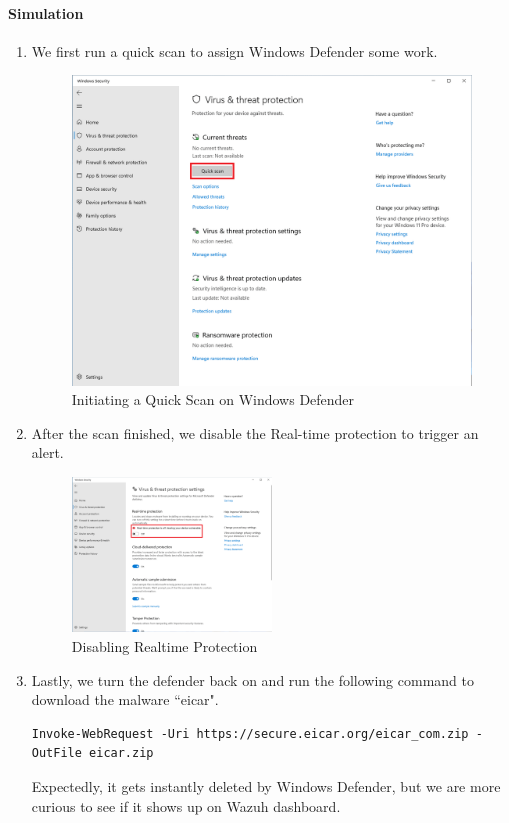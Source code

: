 \paragraph{Simulation}
\begin{enumerate}
    \item We first run a quick scan to assign Windows Defender some work.
    \begin{figure}[H]
        \centering
        \includegraphics[width=\textwidth]{images/malware-detection/windows-log/2.png}
        \caption{Initiating a Quick Scan on Windows Defender}
        \label{fig:win-quick-scan}
    \end{figure}
    \item After the scan finished, we disable the Real-time protection to trigger an alert.
    \begin{figure}[H]
        \centering
        \includegraphics[width=0.5\textwidth]{images/malware-detection/windows-log/3.png}
        \caption{Disabling Realtime Protection}
        \label{fig:win-disable-defender}
    \end{figure}
    \item Lastly, we turn the defender back on and run the following command to download the malware ``eicar".
    \begin{verbatim}
Invoke-WebRequest -Uri https://secure.eicar.org/eicar_com.zip -OutFile eicar.zip
    \end{verbatim}
    Expectedly, it gets instantly deleted by Windows Defender, but we are more curious to see if it shows up on Wazuh dashboard.
\end{enumerate}

